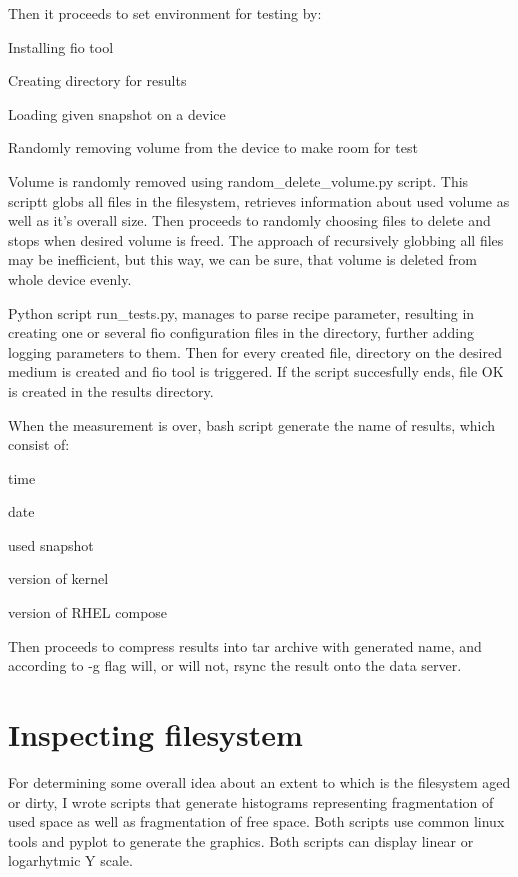 \documentclass[
  color, %
  table, %
  lof,   %
  lot,   %
]{fithesis3}
\begin{document}
Then it proceeds to set environment for testing by:

\begin{compactenum}
  \item Installing fio tool
  \item Creating directory for results
  \item Loading given snapshot on a device
  \item Randomly removing volume from the device to make room for test
\end{compactenum}

Volume is randomly removed using random\_delete\_volume.py script. This scriptt globs all files in the filesystem, retrieves information about used volume as well as it's overall size. Then proceeds to randomly choosing files to delete and stops when desired volume is freed. The approach of recursively globbing all files may be inefficient, but this way, we can be sure, that volume is deleted from whole device evenly.

Python script run\_tests.py, manages to parse recipe parameter, resulting in creating one or several fio configuration files in the directory, further adding logging parameters to them. Then for every created file, directory on the desired medium is created and fio tool is triggered. If the script succesfully ends, file OK is created in the results directory.

When the measurement is over, bash script generate the name of results, which consist of:
\begin{compactenum}
  \item time
  \item date
  \item used snapshot
  \item version of kernel
  \item version of RHEL compose
\end{compactenum}

Then proceeds to compress results into tar archive with generated name, and according to -g flag will, or will not, rsync the result onto the data server.
\section{Inspecting filesystem}
For determining some overall idea about an extent to which is the filesystem aged or dirty, I wrote scripts that generate histograms representing fragmentation of used space as well as fragmentation of free space. Both scripts use common linux tools and pyplot to generate the graphics. Both scripts can display linear or logarhytmic Y scale.
\end{document}
